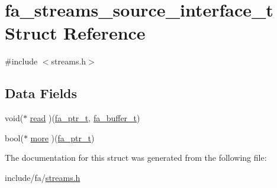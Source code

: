 \hypertarget{structfa__streams__source__interface__t}{\section{fa\-\_\-streams\-\_\-source\-\_\-interface\-\_\-t Struct Reference}
\label{structfa__streams__source__interface__t}
}


{\ttfamily \#include $<$streams.\-h$>$}

\subsection*{Data Fields}
\begin{DoxyCompactItemize}
\item 
void($\ast$ \hyperlink{group___fa_ga1efe3898ecdf2dc288994591b1415e72}{read} )(\hyperlink{group___fa_ga915ddeae99ad7568b273d2b876425197}{fa\-\_\-ptr\-\_\-t}, \hyperlink{group___fa_buffer_ga0ed7a1d783ab322e2e8be02432d0839e}{fa\-\_\-buffer\-\_\-t})
\item 
bool($\ast$ \hyperlink{group___fa_ga7dfcc83aaf192c5002e0417b33bddd7f}{more} )(\hyperlink{group___fa_ga915ddeae99ad7568b273d2b876425197}{fa\-\_\-ptr\-\_\-t})
\end{DoxyCompactItemize}


The documentation for this struct was generated from the following file\-:\begin{DoxyCompactItemize}
\item 
include/fa/\hyperlink{streams_8h}{streams.\-h}\end{DoxyCompactItemize}

